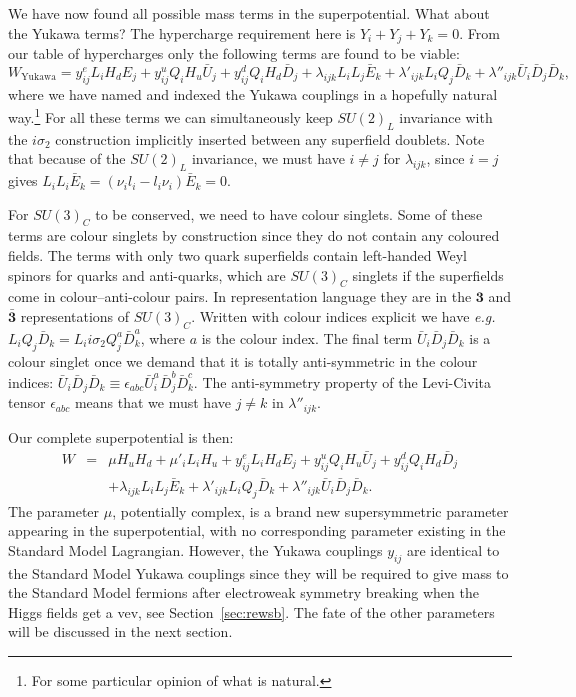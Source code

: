 \documentclass[notes.tex]{subfiles}
\begin{document}
We have now found all possible mass terms in the superpotential. What about the Yukawa terms? The hypercharge requirement here is $Y_i + Y_j + Y_k = 0$. From our table of hypercharges only the following terms are found to be viable:
\[W_\text{Yukawa}=y^e_{ij}L_iH_d E_j + y^u_{ij}Q_iH_u\bar{U}_j +  y^d_{ij}Q_iH_d\bar{D}_j+ \lambda_{ijk} L_iL_j\bar{E}_k + \lambda'_{ijk} L_iQ_j\bar{D}_k + \lambda''_{ijk}\bar{U}_i\bar{D}_j\bar{D}_k,\]
where we have named and indexed the Yukawa couplings in a hopefully natural way.\footnote{For some particular opinion of what is natural.} 
For all these terms we can simultaneously keep $SU(2)_L$ invariance with the $i\sigma_2$ construction implicitly inserted between any superfield doublets.  Note that because of the $SU(2)_L$  invariance, we must have $i\ne j$ for  $\lambda_{ijk}$, since $i=j$ gives $ L_iL_i\bar{E}_k =(\nu_i l_i- l_i\nu_i)\bar E_k=0$.

For $SU(3)_C$ to be conserved, we need to have colour singlets. Some of these terms are colour singlets by construction since they do not contain any coloured fields. The terms with only two quark superfields contain left-handed Weyl spinors for quarks and anti-quarks, which are $SU(3)_C$ singlets if the superfields come in colour--anti-colour pairs. In representation language they are in the $\mathbf 3$ and $\mathbf{\bar 3}$ representations of $SU(3)_C$. Written with  colour indices explicit we have {\it e.g.} $L_i Q_j \bar{D}_k= L_i i\sigma_2 Q_j^a \bar{D}_k^a$, where $a$ is the colour index. The final term $\bar{U}_i\bar{D}_j\bar{D}_k$ is a colour singlet once we demand that it is totally anti-symmetric in the colour indices: $\bar{U}_i\bar{D}_j\bar{D}_k\equiv\epsilon_{abc}\bar{U}_i^a\bar{D}_j^b\bar{D}_k^c$. The anti-symmetry property of the Levi-Civita tensor $\epsilon_{abc}$ means that we must have $j\ne k$ in $ \lambda''_{ijk}$.

Our complete superpotential is then:
\begin{eqnarray}
\label{eq:supolag}
W &=& \mu H_u H_d + \mu'_i L_iH_u + y^e_{ij}L_iH_d E_j + y^u_{ij}Q_iH_u\bar{U}_j +  y^d_{ij}Q_iH_d\bar{D}_j \nonumber\\
&&+ \lambda_{ijk} L_iL_j\bar{E}_k + \lambda'_{ijk} L_iQ_j\bar{D}_k + \lambda''_{ijk}\bar{U}_i\bar{D}_j\bar{D}_k.
\end{eqnarray}
The parameter $\mu$, potentially complex, is a brand new supersymmetric parameter appearing in the superpotential, with no corresponding parameter existing in the Standard Model Lagrangian. However, the Yukawa couplings $y_{ij}$ are identical to the Standard Model Yukawa couplings since they will be required to give mass to the Standard Model fermions after electroweak symmetry breaking when the Higgs fields get a vev, see Section~\ref{sec:rewsb}. The fate of the other parameters will be discussed in the next section.
\end{document}
